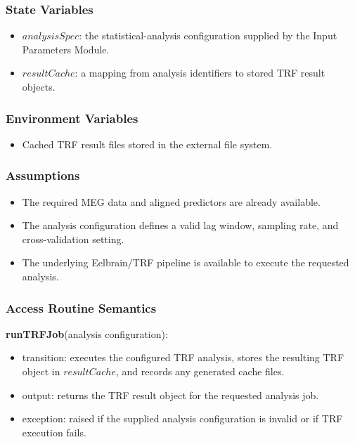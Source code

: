 \documentclass[12pt, titlepage]{article}
\begin{document}
\subsubsection{State Variables}

\begin{itemize}
    \item $analysisSpec$: the statistical-analysis configuration supplied by the Input Parameters Module.
    \item $resultCache$: a mapping from analysis identifiers to stored TRF result objects.
\end{itemize}

\subsubsection{Environment Variables}

\begin{itemize}
    \item Cached TRF result files stored in the external file system.
\end{itemize}

\subsubsection{Assumptions}

\begin{itemize}
    \item The required MEG data and aligned predictors are already available.
    \item The analysis configuration defines a valid lag window, sampling rate, and cross-validation setting.
    \item The underlying Eelbrain/TRF pipeline is available to execute the requested analysis.
\end{itemize}

\subsubsection{Access Routine Semantics}

\noindent \textbf{runTRFJob}(analysis configuration):
\begin{itemize}
    \item transition: executes the configured TRF analysis, stores the resulting TRF object in $resultCache$, and records any generated cache files.
    \item output: returns the TRF result object for the requested analysis job.
    \item exception: raised if the supplied analysis configuration is invalid or if TRF execution fails.
\end{itemize}
\end{document}
